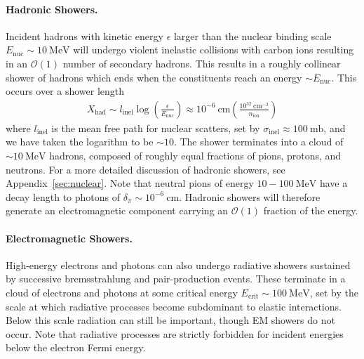 \documentclass[twocolumn, preprintnumbers,amsmath,amssymb,prd, superscriptaddress]{revtex4}
\newcommand{\OO}{\mathcal{O}}
\newcommand{\MeV}{\text{MeV}}
\def\r{\right)}
\def\l{\left(}
\begin{document}
\paragraph{Hadronic Showers.}
Incident hadrons with kinetic energy $\epsilon$ larger than the nuclear binding scale $E_\text{nuc} \sim 10~\MeV$ will undergo violent inelastic collisions with carbon ions resulting in an $\OO(1)$ number of secondary hadrons.
This results in a roughly collinear shower of hadrons which ends when the constituents reach an energy $\sim E_\text{nuc}$.
This occurs over a shower length
\begin{align}
\label{eq:hadlength}
  X_\text{had} \sim l_\text{inel} \log\l\frac{\epsilon}{E_\text{nuc}}\r
  \approx 10^{-6} ~\text{cm} \l\frac{10^{32}~\text{cm}^{-3}}{n_\text{ion}}\r
\end{align}
where $l_\text{inel}$ is the mean free path for nuclear scatters, set by $\sigma_\text{inel} \approx 100 ~\text{mb}$, and we have taken the logarithm to be $\sim 10$.
The shower terminates into a cloud of $\sim 10~\MeV$ hadrons, composed of roughly equal fractions of pions, protons, and neutrons.
For a more detailed discussion of hadronic showers, see Appendix~\ref{sec:nuclear}.
Note that neutral pions of energy $10 - 100 ~\text{MeV}$ have a decay length to photons of $\delta_\pi \sim 10^{-6} ~\text{cm}$.
Hadronic showers will therefore generate an electromagnetic component carrying an $\OO(1)$ fraction of the energy.

\paragraph{Electromagnetic Showers.}
High-energy electrons and photons can also undergo radiative showers sustained by successive bremsstrahlung and pair-production events.
These terminate in a cloud of electrons and photons at some critical energy $E_\text{crit} \sim 100~\MeV$, set by the scale at which radiative processes become subdominant to elastic interactions.
Below this scale radiation can still be important, though EM showers do not occur.
Note that radiative processes are strictly forbidden for incident energies below the electron Fermi energy.
\end{document}
